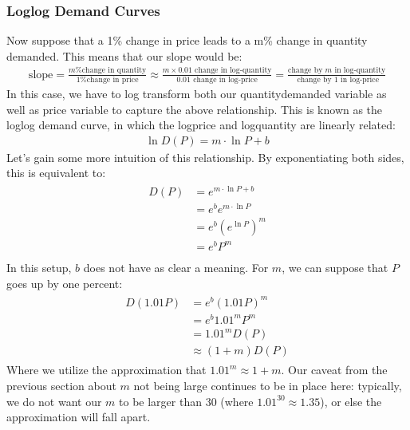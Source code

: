 \documentclass[letterpaper,10pt,english]{jupyterBook}
\begin{document}
\subsubsection{Log\sphinxhyphen{}log Demand Curves}
\label{\detokenize{content/01-demand/03-log-log:log-log-demand-curves}}
\sphinxAtStartPar
Now suppose that a 1\% change in price leads to a m\% change in quantity demanded. This means that our slope would be:
\begin{equation*}
\begin{split}\text{slope} = \frac{m \text{\% change in quantity}}{1 \text{\% change in price}} \approx \frac{m \times 0.01 \text{ change in log-quantity}}{ 0.01 \text{ change in log-price}} = \frac{\text{change by } m  \text{ in log-quantity}}{\text{ change by 1 in log-price}}\end{split}
\end{equation*}
\sphinxAtStartPar
In this case, we have to log transform both our quantity\sphinxhyphen{}demanded variable as well as price variable to capture the above relationship. This is known as the log\sphinxhyphen{}log demand curve, in which the log\sphinxhyphen{}price and log\sphinxhyphen{}quantity are linearly related:
\begin{equation*}
\begin{split}\ln{D(P)} = m\cdot\ln{P} + b\end{split}
\end{equation*}
\sphinxAtStartPar
Let’s gain some more intuition of this relationship. By exponentiating both sides, this is equivalent to:
\begin{equation*}
\begin{split}\begin{align*}
D(P) &= e^{m\cdot\ln{P} + b}\\
&= e^be^{m\cdot\ln{P}} \\
&= e^b(e^{\ln{P}})^m \\
&= e^bP^m \\
\end{align*}\end{split}
\end{equation*}
\sphinxAtStartPar
In this setup, \(b\) does not have as clear a meaning. For \(m\), we can suppose that \(P\) goes up by one percent:
\begin{equation*}
\begin{split}\begin{align*}
D(1.01P) &= e^b(1.01P)^m \\
&= e^b 1.01^m P^m\\
&= 1.01^m D(P) \\
&\approx (1+m) D(P) 
\end{align*}\end{split}
\end{equation*}
\sphinxAtStartPar
Where we utilize the approximation that \(1.01^m \approx 1+m\). Our caveat from the previous section about \(m\) not being large continues to be in place here: typically, we do not want our \(m\) to be larger than 30 (where \(1.01^{30}\approx 1.35\)), or else the approximation will fall apart.
\end{document}
